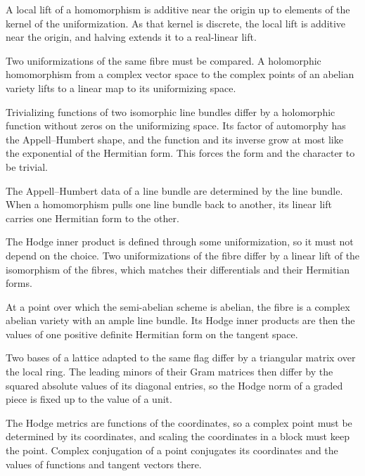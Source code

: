 A local lift of a homomorphism is additive near the origin up to elements of the kernel of the uniformization. As that kernel
is discrete, the local lift is additive near the origin, and halving extends it to a real-linear lift.

Two uniformizations of the same fibre must be compared. A holomorphic homomorphism from a complex vector space to the
complex points of an abelian variety lifts to a linear map to its uniformizing space.

Trivializing functions of two isomorphic line bundles differ by a holomorphic function without zeros on the uniformizing
space. Its factor of
automorphy has the Appell--Humbert shape, and the function and its inverse grow at most like the exponential of the
Hermitian form. This forces the form and the character to be trivial.

The Appell--Humbert data of a line bundle are determined by the line bundle. When a homomorphism pulls one line bundle back to
another, its linear lift carries one Hermitian form to the other.

The Hodge inner product is defined through some uniformization, so it must not depend on the choice. Two uniformizations of the
fibre differ by a linear lift of the isomorphism of the fibres, which matches their differentials and their Hermitian forms.

At a point over which the semi-abelian scheme is abelian, the fibre is a complex abelian variety with an ample line
bundle. Its Hodge inner products are then the values of one positive definite Hermitian form on the tangent space.

Two bases of a lattice adapted to the same flag differ by a triangular matrix over the local ring. The leading minors
of their Gram matrices then differ by the squared absolute values of its diagonal entries, so the Hodge norm of a
graded piece is fixed up to the value of a unit.

The Hodge metrics are functions of the coordinates, so a complex point must be determined by its coordinates, and
scaling the coordinates in a block must keep the point. Complex conjugation of a point conjugates its coordinates and the
values of functions and tangent vectors there.

